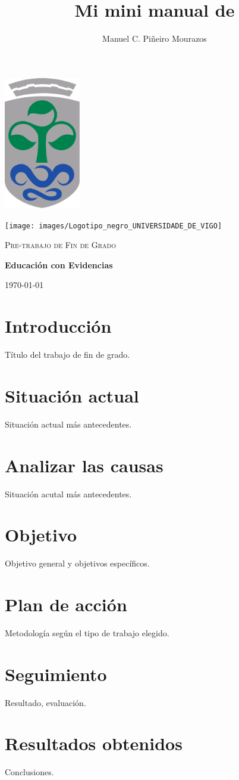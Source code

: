 \documentclass[a4paper, twoside, titlepage, 12pt]{article}
\title{Mi mini manual de \XeLaTeX}
\author{Manuel C. Piñeiro Mourazos}
\begin{document}
\begin{titlepage}
  \centering
	\includegraphics[width=0.25\textwidth]{images/escudo_uvigo}\par\vspace{1cm}
	\texttt{[image: images/Logotipo\_negro\_UNIVERSIDADE\_DE\_VIGO]}\par\vspace{1cm}
	{\scshape\Large Pre-trabajo de Fin de Grado\par}
	\vspace{1.5cm}
	{\huge\bfseries Educación con Evidencias\par}
	\vspace{2cm}
	{\Large\itshape \theauthor\par}
	\vfill
	{\large \today\par}
\end{titlepage}

\tableofcontents %
\newpage %

\section{Introducción}
Título del trabajo de fin de grado.

\section{Situación actual}
Situación actual más antecedentes.

\section{Analizar las causas}
Situación acutal más antecedentes.

\section{Objetivo}
Objetivo general y objetivos específicos.

\section{Plan de acción}
Metodología según el tipo de trabajo elegido.

\section{Seguimiento}
Resultado, evaluación.

\section{Resultados obtenidos}
Conclusiones.
\end{document}
